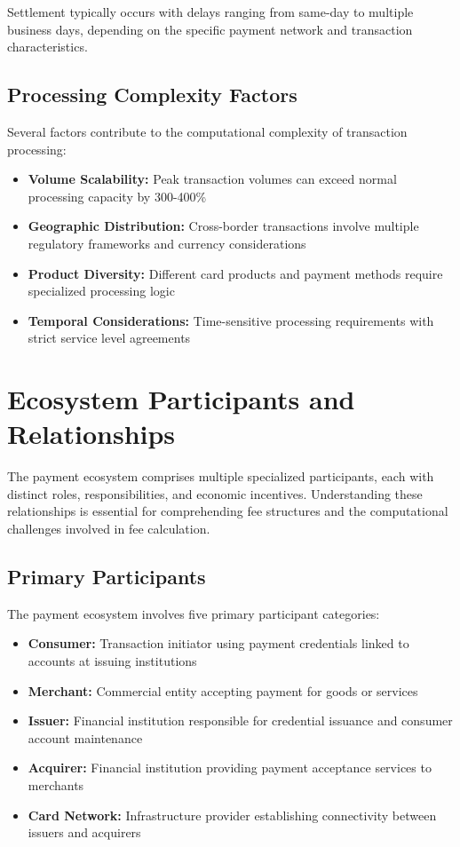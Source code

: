 Settlement typically occurs with delays ranging from same-day to multiple business days, depending on the specific payment network and transaction characteristics.

\subsection{Processing Complexity Factors}

Several factors contribute to the computational complexity of transaction processing:

\begin{itemize}
    \item \textbf{Volume Scalability:} Peak transaction volumes can exceed normal processing capacity by 300-400\%
    \item \textbf{Geographic Distribution:} Cross-border transactions involve multiple regulatory frameworks and currency considerations
    \item \textbf{Product Diversity:} Different card products and payment methods require specialized processing logic
    \item \textbf{Temporal Considerations:} Time-sensitive processing requirements with strict service level agreements
\end{itemize}

\section{Ecosystem Participants and Relationships}

The payment ecosystem comprises multiple specialized participants, each with distinct roles, responsibilities, and economic incentives. Understanding these relationships is essential for comprehending fee structures and the computational challenges involved in fee calculation.

\subsection{Primary Participants}

The payment ecosystem involves five primary participant categories:

\begin{itemize}
   \item \textbf{Consumer:} Transaction initiator using payment credentials linked to accounts at issuing institutions
   \item \textbf{Merchant:} Commercial entity accepting payment for goods or services
   \item \textbf{Issuer:} Financial institution responsible for credential issuance and consumer account maintenance
   \item \textbf{Acquirer:} Financial institution providing payment acceptance services to merchants
   \item \textbf{Card Network:} Infrastructure provider establishing connectivity between issuers and acquirers
\end{itemize}

